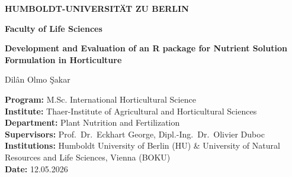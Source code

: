 \thispagestyle{empty}

\vspace*{3cm}

\begin{center}

{\huge \textbf{HUMBOLDT-UNIVERSITÄT ZU BERLIN}\par}
\vspace{1.5cm}
{\LARGE \textbf{Faculty of Life Sciences}\par}
\vspace{3cm}
{\LARGE \textbf{Development and Evaluation of an R package for Nutrient Solution Formulation in Horticulture}\par}
\vspace{1.5cm}

{\large Dilân Olmo Şakar\par}
\vspace{1.5cm}

\Large
\textbf{Program:} M.Sc. International Horticultural Science\\[0.6em]
\textbf{Institute:} Thaer-Institute of Agricultural and Horticultural Sciences\\[0.6em]
\textbf{Department:} Plant Nutrition and Fertilization\\[0.6em]
\textbf{Supervisors:} Prof.\ Dr.\ Eckhart George, Dipl.-Ing.\ Dr.\ Olivier Duboc\\[0.6em]
\textbf{Institutions:} Humboldt University of Berlin (HU) \& University of Natural Resources and Life Sciences, Vienna (BOKU)\\[0.6em]
\textbf{Date:} 12.05.2026
\end{center}

\clearpage
